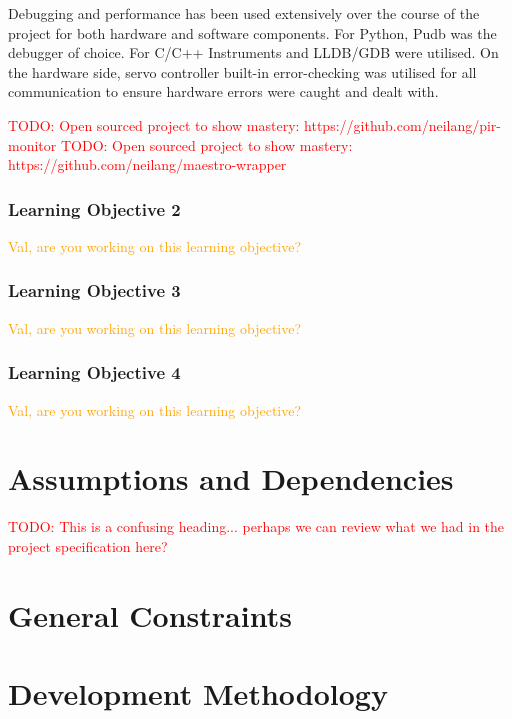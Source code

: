 \documentclass[11pt,a4paper,titlepage]{report}
\begin{document}
Debugging and performance has been used extensively over the course of the project for both hardware and software components. For Python, Pudb was the debugger of choice. For C/C++ Instruments and LLDB/GDB were utilised. On the hardware side, servo controller built-in error-checking was utilised for all communication to ensure hardware errors were caught and dealt with.

\textcolor{red}{TODO: Open sourced project to show mastery: https://github.com/neilang/pir-monitor}
\textcolor{red}{TODO: Open sourced project to show mastery: https://github.com/neilang/maestro-wrapper}


 
\subsubsection{Learning Objective 2}

\textcolor{orange}{Val, are you working on this learning objective?}

\subsubsection{Learning Objective 3}

\textcolor{orange}{Val, are you working on this learning objective?}

\subsubsection{Learning Objective 4}

\textcolor{orange}{Val, are you working on this learning objective?}



\section{Assumptions and Dependencies}

\textcolor{red}{TODO: This is a confusing heading... perhaps we can review what we had in the project specification here?}


\section{General Constraints}

\section{Development Methodology}
\end{document}

